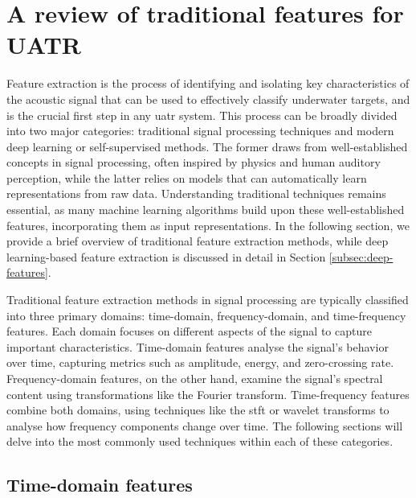 \section{A review of traditional features for UATR}\label{sec:traditional-features}

Feature extraction is the process of identifying and isolating key characteristics of the acoustic signal that can be used to effectively classify underwater targets, and is the crucial first step in any \acrshort{uatr} system. This process can be broadly divided into two major categories: traditional signal processing techniques and modern deep learning or self-supervised methods. The former draws from well-established concepts in signal processing, often inspired by physics and human auditory perception, while the latter relies on models that can automatically learn representations from raw data. Understanding traditional techniques remains essential, as many machine learning algorithms build upon these well-established features, incorporating them as input representations. In the following section, we provide a brief overview of traditional feature extraction methods, while deep learning-based feature extraction is discussed in detail in Section \ref{subsec:deep-features}.


Traditional feature extraction methods in signal processing are typically classified into three primary domains: time-domain, frequency-domain, and time-frequency features. Each domain focuses on different aspects of the signal to capture important characteristics. Time-domain features analyse the signal's behavior over time, capturing metrics such as amplitude, energy, and zero-crossing rate. Frequency-domain features, on the other hand, examine the signal's spectral content using transformations like the Fourier transform. Time-frequency features combine both domains, using techniques like the \acrshort{stft} or wavelet transforms to analyse how frequency components change over time. The following sections will delve into the most commonly used techniques within each of these categories.

\subsection{Time-domain features}

